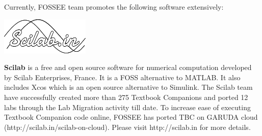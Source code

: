 \documentclass{letter}
\begin{document}

\newpage
Currently, FOSSEE team promotes the following software extensively: \\

\begin{minipage}[t]{0.5\linewidth}
    \begin{center}
        \includegraphics[width=0.8\linewidth]{images/scilab_logo.png}
    \end{center}
\textbf{Scilab} is a free and open source software for numerical computation 
developed by Scilab Enterprises, France. It is a FOSS alternative to MATLAB.  It 
also includes Xcos which is an open source alternative to Simulink. The Scilab 
team have successfully created more than 275 Textbook Companions and ported 12 
labs through the Lab Migration activity till date. To increase ease of executing 
Textbook Companion code online, FOSSEE has ported TBC on GARUDA cloud 
(http://scilab.in/scilab-on-cloud). Please visit http://scilab.in for more 
details.
\end{minipage} \hspace{1cm}
\end{document}
